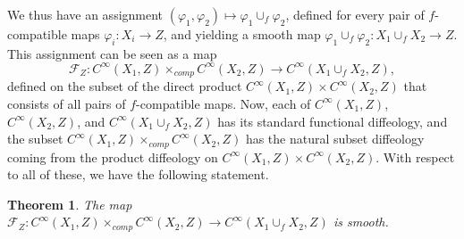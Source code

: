 \documentclass{article}
\newtheorem{thm}[lemma]{Theorem}
\begin{document}
We thus have an assignment $(\varphi_1,\varphi_2)\mapsto\varphi_1\cup_f\varphi_2$, defined for every pair of $f$-compatible maps $\varphi_i:X_i\to Z$, and yielding a smooth map 
$\varphi_1\cup_f\varphi_2:X_1\cup_f X_2\to Z$. This assignment can be seen as a map 
$$\mathcal{F}_Z:C^{\infty}(X_1,Z)\times_{comp}C^{\infty}(X_2,Z)\to C^{\infty}(X_1\cup_f X_2,Z),$$ defined on the subset of the direct product $C^{\infty}(X_1,Z)\times C^{\infty}(X_2,Z)$ that consists of all pairs 
of $f$-compatible maps. Now, each of $C^{\infty}(X_1,Z)$, $C^{\infty}(X_2,Z)$, and $C^{\infty}(X_1\cup_f X_2,Z)$ has its standard functional diffeology, and the subset 
$C^{\infty}(X_1,Z)\times_{comp}C^{\infty}(X_2,Z)$ has the natural subset diffeology coming from the product diffeology on $C^{\infty}(X_1,Z)\times C^{\infty}(X_2,Z)$. With respect to all of these, we have the 
following statement.

\begin{thm}\label{f-compatible:gluing:smooth:thm}
The map $\mathcal{F}_Z:C^{\infty}(X_1,Z)\times_{comp}C^{\infty}(X_2,Z)\to C^{\infty}(X_1\cup_f X_2,Z)$ is smooth.
\end{thm}
\end{document}
